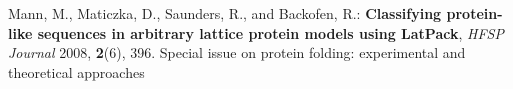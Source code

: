 \documentclass{article}
\begin{document}
\begin{thebibliography}{99}
 {
	Mann, M., Maticzka, D., Saunders, R., and Backofen, R.:
	{\bfseries Classifying protein-like sequences in arbitrary lattice protein models using {LatPack}},
	\emph{HFSP Journal} 2008, {\bfseries 2}(6), 396.
	Special issue on protein folding: experimental and theoretical approaches
	}
\end{thebibliography}
 
\end{document}
